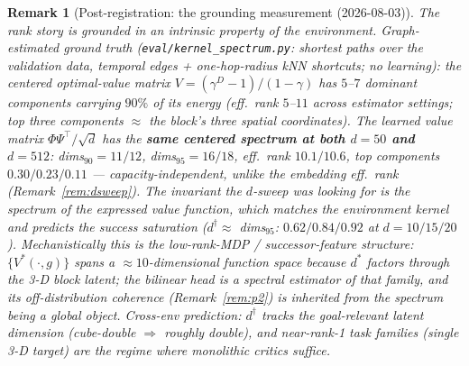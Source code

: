 \documentclass[10pt]{article}
\newtheorem{remark}{Remark}
\begin{document}
\begin{remark}[Post-registration: the grounding measurement (2026-08-03)]\label{rem:spectrum}
The rank story is grounded in an intrinsic property of the environment. Graph-estimated
ground truth (\texttt{eval/kernel\_spectrum.py}: shortest paths over the validation data,
temporal edges + one-hop-radius kNN shortcuts; no learning): the centered optimal-value
matrix $V=(\gamma^{D}-1)/(1-\gamma)$ has $5$--$7$ dominant components carrying $90\%$ of
its energy (eff.\ rank $5$--$11$ across estimator settings; top three components
$\approx$ the block's three spatial coordinates). The \emph{learned} value matrix
$\Phi\Psi^\top/\sqrt d$ has the \textbf{same centered spectrum at both $d{=}50$ and
$d{=}512$}: dims$_{90}=11/12$, dims$_{95}=16/18$, eff.\ rank $10.1/10.6$, top components
$0.30/0.23/0.11$ --- capacity-independent, unlike the embedding eff.\ rank
(Remark~\ref{rem:dsweep}). The invariant the $d$-sweep was looking for is the spectrum of
the \emph{expressed value function}, which matches the environment kernel and predicts the
success saturation ($d^\dagger\approx$ dims$_{95}$: $0.62/0.84/0.92$ at $d=10/15/20$).
Mechanistically this is the low-rank-MDP / successor-feature structure: $\{V^*(\cdot,g)\}$
spans a $\approx10$-dimensional function space because $d^*$ factors through the 3-D block
latent; the bilinear head is a spectral estimator of that family, and its off-distribution
coherence (Remark~\ref{rem:p2}) is inherited from the spectrum being a global object.
Cross-env prediction: $d^\dagger$ tracks the goal-relevant latent dimension (cube-double
$\Rightarrow$ roughly double), and near-rank-1 task families (single 3-D target) are the
regime where monolithic critics suffice.
\end{remark}
\end{document}
